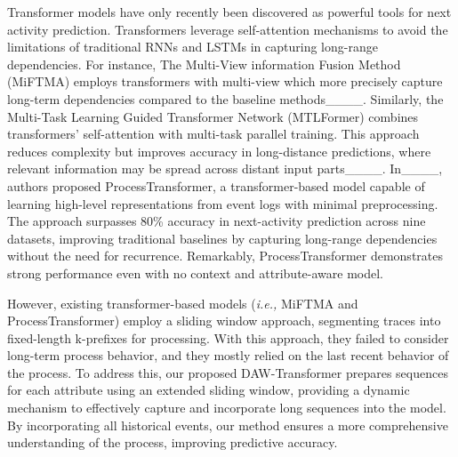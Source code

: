 Transformer models have only recently been discovered as powerful tools for next activity prediction. Transformers leverage self-attention mechanisms to avoid the limitations of traditional RNNs and LSTMs in capturing long-range dependencies. For instance, The Multi-View information Fusion Method (MiFTMA) employs transformers with multi-view which more precisely capture long-term dependencies compared to the baseline methods____. Similarly, the Multi-Task Learning Guided Transformer Network (MTLFormer) combines transformers' self-attention with multi-task parallel training. This approach reduces complexity but improves accuracy in long-distance predictions, where relevant information may be spread across distant input parts____.
In____, authors proposed ProcessTransformer, a transformer-based model capable of learning high-level representations from event logs with minimal preprocessing. The approach surpasses 80\% accuracy in next-activity prediction across nine datasets, improving traditional baselines by capturing long-range dependencies without the need for recurrence. Remarkably, ProcessTransformer demonstrates strong performance even with no context and attribute-aware model.

However, existing transformer-based models (\textit{i.e.,} MiFTMA and ProcessTransformer) employ a sliding window approach, segmenting traces into fixed-length k-prefixes for processing. With this approach, they failed to consider long-term process behavior, and they mostly relied on the last recent behavior of the process. To address this, our proposed DAW-Transformer prepares sequences for each attribute using an extended sliding window, providing a dynamic mechanism to effectively capture and incorporate long sequences into the model. By incorporating all historical events, our method ensures a more comprehensive understanding of the process, improving predictive accuracy.